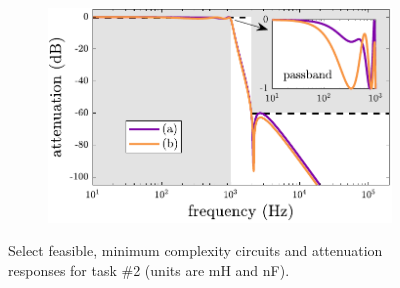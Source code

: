 \begin{figure}
\begin{subfigure}[t]{0.5\textwidth}
\includegraphics[width=\textwidth]{../ch6/figures/reduced/r_lpf2_magnitude}
\caption{\label{fig:lpf2_magnitude}}
\end{subfigure}%

\caption[Select feasible, minimum complexity circuits and attenuation responses for  task \#2.]{Select feasible, minimum complexity circuits and attenuation responses for  task \#2 (units are mH and nF).\label{fig:lpf2}}

\end{figure}